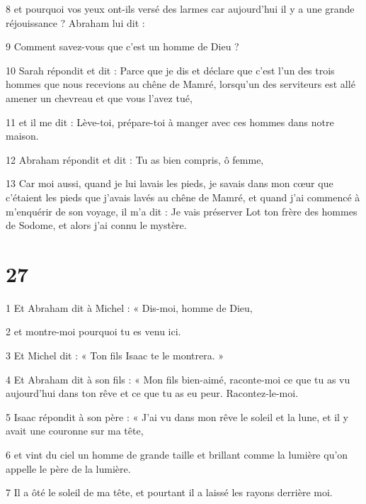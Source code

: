 \par 8 et pourquoi vos yeux ont-ils versé des larmes car aujourd'hui il y a une grande réjouissance ? Abraham lui dit :

\par 9 Comment savez-vous que c'est un homme de Dieu ?

\par 10 Sarah répondit et dit : Parce que je dis et déclare que c'est l'un des trois hommes que nous recevions au chêne de Mamré, lorsqu'un des serviteurs est allé amener un chevreau et que vous l'avez tué,

\par 11 et il me dit : Lève-toi, prépare-toi à manger avec ces hommes dans notre maison.

\par 12 Abraham répondit et dit : Tu as bien compris, ô femme,

\par 13 Car moi aussi, quand je lui lavais les pieds, je savais dans mon cœur que c'étaient les pieds que j'avais lavés au chêne de Mamré, et quand j'ai commencé à m'enquérir de son voyage, il m'a dit : Je vais préserver Lot ton frère des hommes de Sodome, et alors j'ai connu le mystère.


\chapter{27}

\par 1 Et Abraham dit à Michel : « Dis-moi, homme de Dieu,

\par 2 et montre-moi pourquoi tu es venu ici.

\par 3 Et Michel dit : « Ton fils Isaac te le montrera. »

\par 4 Et Abraham dit à son fils : « Mon fils bien-aimé, raconte-moi ce que tu as vu aujourd'hui dans ton rêve et ce que tu as eu peur. Racontez-le-moi.

\par 5 Isaac répondit à son père : « J'ai vu dans mon rêve le soleil et la lune, et il y avait une couronne sur ma tête,

\par 6 et vint du ciel un homme de grande taille et brillant comme la lumière qu'on appelle le père de la lumière.

\par 7 Il a ôté le soleil de ma tête, et pourtant il a laissé les rayons derrière moi.

